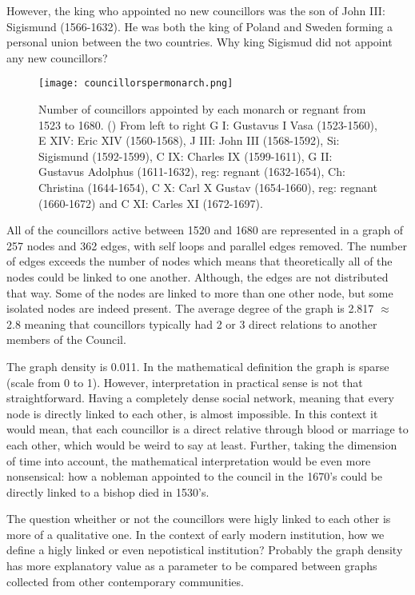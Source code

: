 However, the king who appointed no new councillors was the son of John III: Sigismund (1566-1632). He was both the king of Poland and Sweden forming a personal union between the two countries. Why king Sigismud did not appoint any new councillors? 

\begin{figure}
	\texttt{[image: councillorspermonarch.png]}
	\centering
	\caption[Number of councillors appointed by each ruler between 1523-1680] {Number of councillors appointed by each monarch or regnant from 1523 to 1680. (\cite{councillorsDS}) From left to right G I: Gustavus I Vasa (1523-1560), E XIV: Eric XIV (1560-1568), J III: John III (1568-1592), Si: Sigismund (1592-1599), C IX: Charles IX (1599-1611), G II: Gustavus Adolphus (1611-1632), reg: regnant (1632-1654), Ch: Christina (1644-1654), C X: Carl X Gustav (1654-1660), reg: regnant (1660-1672) and C XI: Carles XI (1672-1697).}
	\centering
\end{figure}

All of the councillors active between 1520 and 1680 are represented in a graph of 257 nodes and 362 edges, with self loops and parallel edges removed. The number of edges exceeds the number of nodes which means that theoretically all of the nodes could be linked to one another. Although, the edges are not distributed that way. Some of the nodes are linked to more than one other node, but some isolated nodes are indeed present. The average degree of the graph is 2.817 $\approx$ 2.8 meaning that councillors typically had 2 or 3 direct relations to another members of the Council.

The graph density is 0.011. In the mathematical definition the graph is sparse (scale from 0 to 1). However, interpretation in practical sense is not that straightforward. Having a completely dense social network, meaning that every node is directly linked to each other, is almost impossible. In this context it would mean, that each councillor is a direct relative through blood or marriage to each other, which would be weird to say at least. Further, taking the dimension of time into account, the mathematical interpretation would be even more nonsensical: how a nobleman appointed to the council in the 1670's could be directly linked to a bishop died in 1530's. 

The question wheither or not the councillors were higly linked to each other is more of a qualitative one. In the context of early modern institution, how we define a higly linked or even nepotistical institution? Probably the graph density has more explanatory value as a parameter to be compared between graphs collected from other contemporary communities.

